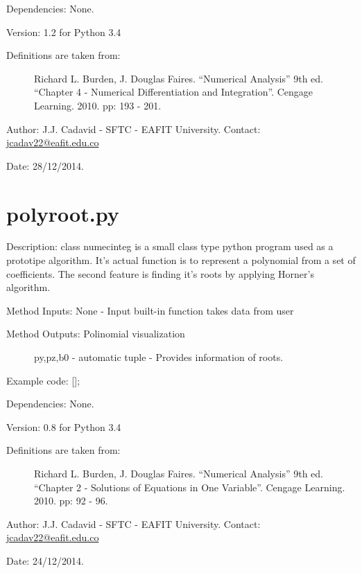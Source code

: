 \documentclass[letterpaper,10pt,oneside]{sphinxmanual}
\theoremstyle{plain}%
\theoremstyle{definition}%
\theoremstyle{remark}%
\begin{document}
Dependencies: None.

Version: 1.2 for Python 3.4
\begin{description}
\item[{Definitions are taken from:}] \leavevmode
Richard L. Burden, J. Douglas Faires. ``Numerical Analysis'' 9th ed.
``Chapter 4 - Numerical Differentiation and Integration''. 
Cengage Learning. 2010. pp: 193 - 201.

\end{description}

Author: J.J. Cadavid - SFTC - EAFIT University.
Contact: \href{mailto:jcadav22@eafit.edu.co}{jcadav22@eafit.edu.co}

Date: 28/12/2014.


\section{polyroot.py}
\label{code:polyroot-py}\label{code:module-polyroot}
Description: class numecinteg is a small class type python program used as 
a prototipe algorithm. It's actual function is to represent a polynomial from
a set of coefficients. The second feature is finding it's roots by applying
Horner's algorithm.

Method Inputs: None - Input built-in function takes data from user
\begin{description}
\item[{Method Outputs: Polinomial visualization}] \leavevmode
py,pz,b0 - automatic tuple - Provides information of roots.

\end{description}

Example code: {[}{]};

Dependencies: None.

Version: 0.8 for Python 3.4
\begin{description}
\item[{Definitions are taken from:}] \leavevmode
Richard L. Burden, J. Douglas Faires. ``Numerical Analysis'' 9th ed.
``Chapter 2 - Solutions of Equations in One Variable''. 
Cengage Learning. 2010. pp: 92 - 96.

\end{description}

Author: J.J. Cadavid - SFTC - EAFIT University.
Contact: \href{mailto:jcadav22@eafit.edu.co}{jcadav22@eafit.edu.co}

Date: 24/12/2014.
\end{document}
